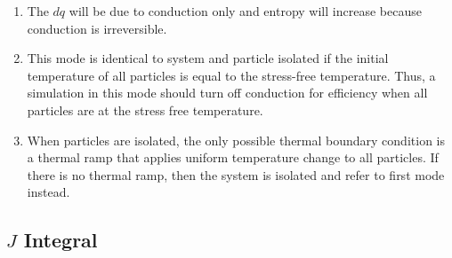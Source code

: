 \documentclass[11pt]{article}
\begin{document}
\begin{table}
{\begin{enumerate}
constant will be added to $dS$ and $dQ$.
\item The $dq$ will be due to conduction only and entropy will increase because conduction is irreversible.
\item This mode is identical to system and particle isolated if the initial temperature of all particles is equal to the stress-free temperature. Thus, a simulation in this mode should turn off conduction for efficiency when all particles
are at the stress free temperature.
\item When particles are isolated, the only possible thermal boundary condition is a thermal ramp that applies uniform temperature change to all particles. If there is no thermal ramp, then the system is isolated and refer to first mode instead.
\end{enumerate}
}
\end{table}

\subsection{$J$ Integral}
\end{document}
